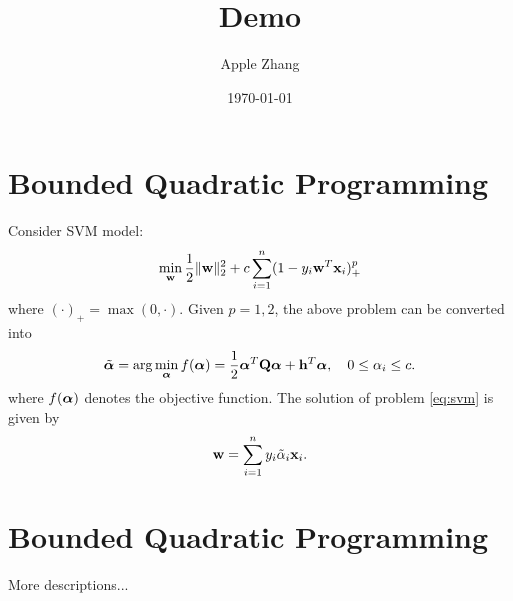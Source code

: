 \documentclass{article}
\title{Demo}
\author{Apple Zhang}
\date{\today}
\begin{document}
\maketitle


\section{Bounded Quadratic Programming}
Consider SVM model:
\begin{align}
    \min_{{\mathbf w}}\frac12\|{\mathbf w}\|_2^2+c\sum_{i=1}^n(1-y_i{\mathbf w}^T{\mathbf x}_i)^{p}_+\label{eq:svm}
\end{align}
where $(\cdot)_+=\max(0,\cdot)$.
Given $p=1,2$, the above problem can be converted into
\begin{align}
    \tilde{{\bm\alpha}}=\arg\min_{{\bm\alpha}}f({\bm\alpha})=\frac12{\bm\alpha}^T{\mathbf Q}{\bm\alpha}+{\mathbf h}^T{\bm\alpha},\quad 0\leq\alpha_i\leq c.\label{eq:boxqp}
\end{align}
where $f({\bm\alpha})$ denotes the objective function.
The solution of problem \eqref{eq:svm} is given by
\begin{equation}
    {\mathbf w}=\sum_{i=1}^ny_i\tilde\alpha_i{\mathbf x}_i.
\end{equation}


\section{Bounded Quadratic Programming}
More descriptions...





\end{document}
